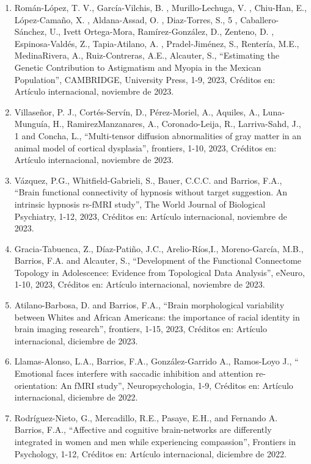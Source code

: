 \documentclass[12pt]{article}
\begin{document}
\begin{enumerate}
\item Román-López, T. V., García-Vilchis, B. , Murillo-Lechuga, V. , Chiu-Han, E., López-Camaño, X. , Aldana-Assad, O. , Diaz-Torres, 
S., 
5 , Caballero-Sánchez, U., Ivett Ortega-Mora, Ramírez-González, D., Zenteno, D. , Espinosa-Valdés, Z., Tapia-Atilano, A. , 
Pradel-Jiménez, S., Rentería, M.E., MedinaRivera, A., Ruiz-Contreras, A.E., Alcauter, S., “Estimating the Genetic Contribution to 
Astigmatism and Myopia in the Mexican Population”, CAMBRIDGE, University Press, 1-9, 2023, Créditos en: Artículo internacional, 
noviembre de 2023.

\item Villaseñor, P. J., Cortés-Servín, D., Pérez-Moriel, A., Aquiles, A., Luna-Munguía, H., RamirezManzanares, A., Coronado-Leija, R., 
Larriva-Sahd, J., 1 and Concha, L., “Multi-tensor diffusion abnormalities of gray matter in an animal model of cortical dysplasia”, 
frontiers, 1-10, 2023, Créditos en: Artículo internacional, noviembre de 2023.

\item Vázquez, P.G., Whitfield-Gabrieli, S., Bauer, C.C.C. and Barrios, F.A., “Brain functional connectivity of hypnosis without target 
suggestion. An intrinsic hypnosis rs-fMRI study”, The World Journal of Biological Psychiatry, 1-12, 2023, Créditos en: Artículo 
internacional, noviembre de 2023.

\item Gracia-Tabuenca, Z., Díaz-Patiño, J.C., Arelio-Ríos,I., Moreno-García, M.B., Barrios, F.A. and Alcauter, S., “Development of the 
Functional Connectome Topology in Adolescence: Evidence from Topological Data Analysis”, eNeuro, 1-10, 2023, Créditos en: Artículo 
internacional, noviembre de 2023.

\item Atilano-Barbosa, D. and Barrios, F.A., “Brain morphological variability between Whites and African Americans: the importance of 
racial identity in brain imaging research”, frontiers, 1-15, 2023, Créditos en: Artículo internacional, diciembre de 2023.

\item Llamas-Alonso, L.A., Barrios, F.A., González-Garrido A., Ramos-Loyo J., “ Emotional faces interfere with saccadic inhibition and 
attention re-orientation: An fMRI study”, Neuropsychologia, 1-9, Créditos en: Artículo internacional, diciembre de 2022.

\item Rodríguez-Nieto, G., Mercadillo, R.E., Pasaye, E.H., and Fernando A. Barrios, F.A., “Affective and cognitive brain-networks are 
differently integrated in women and men while experiencing compassion”, Frontiers in Psychology, 1-12, Créditos en: Artículo 
internacional, diciembre de 2022.


\end{enumerate}
\end{document}
